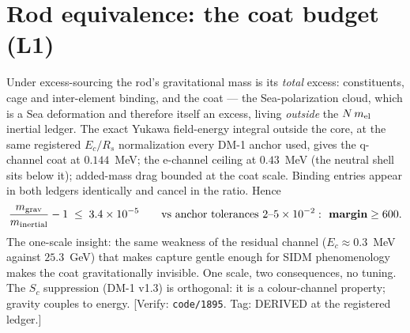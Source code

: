 \documentclass[11pt]{article}
\begin{document}
\section{Rod equivalence: the coat budget (L1)}
\label{sec:L1}
Under excess-sourcing the rod's gravitational mass is its \emph{total} excess: constituents, cage and
inter-element binding, and the coat --- the Sea-polarization cloud, which is a Sea deformation and
therefore itself an excess, living \emph{outside} the $N\,m_{\rm el}$ inertial ledger. The exact
Yukawa field-energy integral outside the core, at the same registered $E_c/R_s$ normalization every
DM-1 anchor used, gives the q-channel coat at $0.144$~MeV; the e-channel ceiling at $0.43$~MeV (the
neutral shell sits below it); added-mass drag bounded at the coat scale. Binding entries appear in
both ledgers identically and cancel in the ratio. Hence
\[ \frac{m_{\rm grav}}{m_{\rm inertial}} - 1 \;\leq\; 3.4\times10^{-5}
   \qquad \text{vs anchor tolerances } 2\text{--}5\times10^{-2}: \textbf{ margin} \geq 600. \]
The one-scale insight: the same weakness of the residual channel ($E_c \approx 0.3$~MeV against
$25.3$~GeV) that makes capture gentle enough for SIDM phenomenology makes the coat gravitationally
invisible. One scale, two consequences, no tuning. The $S_c$ suppression (DM-1 v1.3) is orthogonal:
it is a colour-channel property; gravity couples to energy. [Verify: \texttt{code/1895}. Tag:
DERIVED at the registered ledger.]
\end{document}
